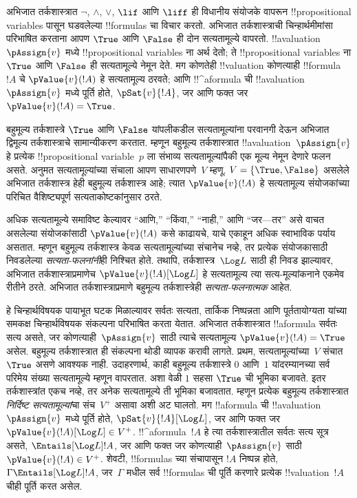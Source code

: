 \documentclass[../../../include/open-logic-section]{subfiles}
\begin{document}


अभिजात तर्कशास्त्रात $\lnot$, $\land$, $\lor$, $\lif$ आणि
$\liff$ ही विधानीय संयोजके वापरून !!{propositional variable}s पासून
घडवलेल्या !!{formula}s चा विचार करतो. अभिजात तर्कशास्त्राची
चिन्हार्थमीमांसा परिभाषित करताना आपण $\True$ आणि $\False$ ही दोन
सत्यतामूल्ये वापरतो. !!a{valuation}~$\pAssign{v}$ मध्ये
!!{propositional variable}s ना अर्थ देतो; ते !!{propositional variable}s ना $\True$ आणि
$\False$ ही सत्यतामूल्ये नेमून देते. मग कोणतेही !!{valuation}
कोणत्याही !!{formula}~$!A$ चे $\pValue{v}(!A)$ हे सत्यतामूल्य
ठरवते; आणि !!^a{formula} ची !!a{valuation}~$\pAssign{v}$ मध्ये
पूर्ति होते, $\pSat{v}{!A}$, जर आणि फक्त जर
$\pValue{v}(!A) = \True$.

बहुमूल्य तर्कशास्त्रे $\True$ आणि $\False$ यांपलीकडील
सत्यतामूल्यांना परवानगी देऊन अभिजात द्विमूल्य तर्कशास्त्राचे
सामान्यीकरण करतात. म्हणून बहुमूल्य तर्कशास्त्रात
!!a{valuation}~$\pAssign{v}$ हे प्रत्येक !!{propositional variable}~$p$
ला संभाव्य सत्यतामूल्यांपैकी एक मूल्य नेमून देणारे फलन असते.
अनुमत सत्यतामूल्यांच्या संचाला आपण साधारणपणे~$V$ म्हणू.
$V = \{\True, \False\}$ असलेले अभिजात तर्कशास्त्र हेही
बहुमूल्य तर्कशास्त्र आहे; त्यात $\pValue{v}(!A)$ हे सत्यतामूल्य
संयोजकांच्या परिचित वैशिष्ट्यपूर्ण सत्यताकोष्टकांनुसार ठरते.

अधिक सत्यतामूल्ये समाविष्ट केल्यावर ``आणि,'' ``किंवा,'' ``नाही,''
आणि ``जर---तर'' असे वाचत असलेल्या संयोजकांसाठी
$\pValue{v}(!A)$ कसे काढायचे, याचे एकाहून अधिक स्वाभाविक
पर्याय असतात. म्हणून बहुमूल्य तर्कशास्त्र केवळ सत्यतामूल्यांच्या
संचानेच नव्हे, तर प्रत्येक संयोजकासाठी निवडलेल्या
\emph{सत्यता-फलनांनी}ही निश्चित होते. तथापि, तर्कशास्त्र~$\Log L$
साठी ही निवड झाल्यावर, अभिजात तर्कशास्त्राप्रमाणेच
$\pValue{v}(!A)[\Log L]$ हे सत्यतामूल्य त्या सत्य-मूल्यांकनाने
एकमेव रीतीने ठरते. अभिजात तर्कशास्त्राप्रमाणे बहुमूल्य
तर्कशास्त्रेही \emph{सत्यता-फलनात्मक} आहेत.

हे चिन्हार्थविषयक पायाभूत घटक मिळाल्यावर सर्वतः सत्यता,
तार्किक निष्पन्नता आणि पूर्ततायोग्यता यांच्या समकक्ष
चिन्हार्थविषयक संकल्पना परिभाषित करता येतात. अभिजात
तर्कशास्त्रात !!a{formula} सर्वतः सत्य असते, जर
कोणत्याही~$\pAssign{v}$ साठी त्याचे सत्यतामूल्य
$\pValue{v}(!A) = \True$ असेल. बहुमूल्य तर्कशास्त्रात ही
संकल्पना थोडी व्यापक करावी लागते. प्रथम, सत्यतामूल्यांच्या~$V$
संचात $\True$ असणे आवश्यक नाही. उदाहरणार्थ,
काही बहुमूल्य तर्कशास्त्रे $0$ आणि~$1$ यांदरम्यानच्या सर्व
परिमेय संख्या सत्यतामूल्ये म्हणून वापरतात. अशा वेळी $1$
सहसा $\True$ ची भूमिका बजावते. इतर तर्कशास्त्रांत
एकच नव्हे, तर अनेक सत्यतामूल्ये ती भूमिका बजावतात.
म्हणून प्रत्येक बहुमूल्य तर्कशास्त्रात \emph{निर्दिष्ट
सत्यतामूल्यां}चा संच~$V^+$ असावा अशी अट घालतो.
मग !!a{formula} ची !!a{valuation}~$\pAssign{v}$ मध्ये
पूर्ति होते, $\pSat{v}{!A}[\Log L]$, जर आणि फक्त जर
$\pValue{v}(!A)[\Log L] \in V^+$. !!^a{formula}~$!A$
हे त्या तर्कशास्त्रातील सर्वतः सत्य सूत्र असते,
$\Entails[\Log L] !A$, जर आणि फक्त जर
कोणत्याही~$\pAssign{v}$ साठी $\pValue{v}(!A) \in V^+$.
शेवटी, !!{formula}s च्या संचापासून $!A$ निष्पन्न होते,
$\Gamma \Entails[\Log L] !A$, जर~$\Gamma$ मधील सर्व
!!{formula}s ची पूर्ति करणारे प्रत्येक !!{valuation}~$!A$
चीही पूर्ति करत असेल.
\end{document}
